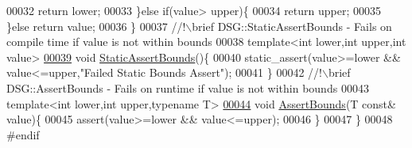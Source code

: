 \begin{DoxyCode}
00032             \textcolor{keywordflow}{return} lower;
00033         \}\textcolor{keywordflow}{else} \textcolor{keywordflow}{if}(value> upper)\{
00034             \textcolor{keywordflow}{return} upper;
00035         \}\textcolor{keywordflow}{else} \textcolor{keywordflow}{return} value;
00036     \}\textcolor{comment}{}
00037 \textcolor{comment}{    //!\(\backslash\)brief DSG::StaticAssertBounds - Fails on compile time if value is not within bounds}
00038 \textcolor{comment}{}    \textcolor{keyword}{template}<\textcolor{keywordtype}{int} lower,\textcolor{keywordtype}{int} upper,\textcolor{keywordtype}{int} value>
\hypertarget{_bounds_8h_source_l00039}{}\hyperlink{namespace_d_s_g_a3fa12557d889e704f2e33d88929ec67a}{00039}     \textcolor{keywordtype}{void} \hyperlink{namespace_d_s_g_a3fa12557d889e704f2e33d88929ec67a}{StaticAssertBounds}()\{
00040         static\_assert(value>=lower && value<=upper,\textcolor{stringliteral}{"Failed Static Bounds Assert"});
00041     \}\textcolor{comment}{}
00042 \textcolor{comment}{    //!\(\backslash\)brief DSG::AssertBounds - Fails on runtime if value is not within bounds}
00043 \textcolor{comment}{}    \textcolor{keyword}{template}<\textcolor{keywordtype}{int} lower,\textcolor{keywordtype}{int} upper,\textcolor{keyword}{typename} T>
\hypertarget{_bounds_8h_source_l00044}{}\hyperlink{namespace_d_s_g_a386b0133be9f4c7cb1ba014170ce294d}{00044}     \textcolor{keywordtype}{void} \hyperlink{namespace_d_s_g_a386b0133be9f4c7cb1ba014170ce294d}{AssertBounds}(T \textcolor{keyword}{const}& value)\{
00045         assert(value>=lower && value<=upper);
00046     \}
00047 \}
00048 \textcolor{preprocessor}{#endif}
\end{DoxyCode}
